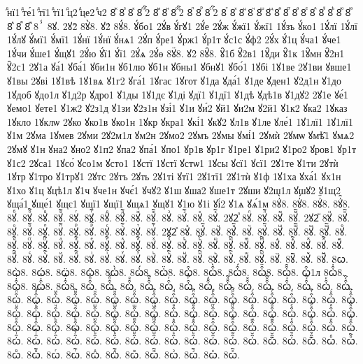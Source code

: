 {ⷣнї1
ⷣте́1
ⷣтї1
ⷣтї1
ⷣц2
ⷣце2
ⷣч2
8ⷤ
8ⷥ
8ⷦ
8ⷧ
ⷧ҇2
8ⷨ
8ⷩ
8ⷪ
ⷪ҇2
8ⷫ
8ⷬ
8ⷭ
ⷭ҇2
8ⷮ
8ⷯ
8ⷰ
8ⷱ
8ⷲ
8ⷳ
8ⷴ
8ⷵ
8ⷶ
8ⷷ
8ⷸ
8ⷹ
8ⷺ
8ⷻ
8ⷼ
8ⷽ
8ⷾ
8ⷿ
8ⸯ
8ꙋ.
2ꙋ2̀
8ꙋ̀8.
ꙋ2́
8ꙋ́8.
ꙋ́бо1
2ꙋ́в
ꙋ́гꙋ1
2ꙋ́е
2ꙋ́ж
ꙋ́жї1
ꙋ́жї1
1ꙋ́зъ
ꙋ́ко1
1ꙋ́лї
1ꙋ́лї
1ꙋ́лꙋ
ꙋ́мї1
ꙋ́мї1
1ꙋ́нї
1ꙋ́нї
ꙋ́нѧ1
2ꙋ́п
ꙋ́ре1
ꙋ́рж1
ꙋ́р1т
ꙋ́с1с
ꙋ́ф2
2ꙋ́х
ꙋ́1ц
ꙋ́ча1
ꙋ́че1
1ꙋ́чи
ꙋ́ше1
ꙋ́щꙋ1
2ꙋ́ю
ꙋ́ї1
ꙋ́ї1
2ꙋ́ѧ
2ꙋ́ѳ
8ꙋ̈8.
ꙋ2̑
8ꙋ̑8.
ꙋ̑1б
ꙋ̑2в1
1ꙋ̑ди
ꙋ̑1к
1ꙋ̑мн
ꙋ̑2н1
ꙋ̑2с1
2ꙋ1а
ꙋа́1
ꙋба́1
ꙋби1н
ꙋб1лю
ꙋб1н
ꙋбны1
ꙋбнꙋ1
ꙋбо́1
1ꙋбі
1ꙋ1ве
2ꙋ1ви
ꙋвше1
ꙋ1вы
2ꙋві
1ꙋ1вѣ
1ꙋ1вѧ
ꙋ1г2
ꙋга́1
1ꙋгас
1ꙋгот
ꙋ1да
ꙋда́1
ꙋ1де
ꙋден1
ꙋ2д1н
ꙋ1до
1ꙋдоб
ꙋдо1л
ꙋ1д2р
ꙋдро1
ꙋ1ды
1ꙋ1дє
ꙋ1ді
ꙋдї1
ꙋ1дї1
ꙋ1дѣ
ꙋдѣ1в
ꙋ1дꙋ2
2ꙋ1е
ꙋе́1
ꙋемо1
ꙋете1
ꙋ1ж2
ꙋ2з1д
ꙋ1зи
ꙋ2з1н
ꙋзі́1
ꙋ1и
ꙋи́2
ꙋй1
ꙋи2м
ꙋ2й1
ꙋ1к2
ꙋка2
1ꙋказ
1ꙋкло
1ꙋклѡ
2ꙋко
ꙋко1в
ꙋко1н
1ꙋкр
ꙋкра1
ꙋкі́1
ꙋкꙋ2
ꙋл1в
ꙋ1ле
ꙋле́1
1ꙋ1лї1
1ꙋ1лї1
ꙋ1м
2ꙋма
1ꙋмев
2ꙋми
2ꙋ2м1л
ꙋм2н
2ꙋмо2
2ꙋмъ
2ꙋмы
ꙋмі́1
2ꙋмѝ
2ꙋмѡ
ꙋмѣ̑1
ꙋмѧ2
2ꙋмꙋ
ꙋ1н
ꙋна2
ꙋно2
ꙋ1п2
ꙋпа2
ꙋпа́1
ꙋпо1
ꙋр1в
ꙋр1г
ꙋ1ре1
ꙋ1ри2
ꙋ1ро2
ꙋров1
ꙋр1т
ꙋ1с2
2ꙋса1
1ꙋсо́
ꙋсо1м
ꙋсто1
1ꙋстї
1ꙋстї
ꙋстѡ1
1ꙋсы
ꙋсї1
ꙋсї1
2ꙋ1те
ꙋ1ти
2ꙋтѝ
1ꙋтр
ꙋ1тро
ꙋ1трꙋ1
2ꙋтс
2ꙋтъ
2ꙋть
2ꙋ1ті
ꙋтї1
2ꙋ1тї1
2ꙋ1тѝ
ꙋ1ф
1ꙋ1ха
ꙋха́1
ꙋх1н
ꙋ1хо
ꙋ1ц
ꙋцѣ1л
ꙋ1ч
ꙋче1н
ꙋчє́1
ꙋчꙋ2
ꙋ1ш
ꙋша2
ꙋше1т
2ꙋши
ꙋ2ш1л
ꙋшꙋ2
ꙋ1щ2
ꙋща́1
ꙋще́1
ꙋщє1
ꙋщї1
ꙋщї1
ꙋщѧ1
ꙋщꙋ1
ꙋ1ю
ꙋ1і
ꙋі́2
ꙋ1ѧ
ꙋѧ́1м
8ꙋ҆̀8.
8ꙋ҆́8.
8ꙋ҆̈8.
8ꙋ҆̑8.
8ꙋⷠ.
8ꙋⷠ҇.
8ꙋⷡ.
8ꙋⷡ҇.
8ꙋⷢ.
8ꙋⷢ҇.
8ꙋⷣ.
8ꙋⷣ҇.
8ꙋⷤ.
8ꙋⷤ҇.
8ꙋⷥ.
8ꙋⷥ҇.
8ꙋⷦ.
8ꙋⷦ҇.
2ꙋ2ⷧ
8ꙋⷧ.
8ꙋⷧ҇.
8ꙋⷨ.
8ꙋⷨ҇.
2ꙋ2ⷩ
8ꙋⷩ.
8ꙋⷩ҇.
8ꙋⷪ.
8ꙋⷪ҇.
8ꙋⷫ.
8ꙋⷫ҇.
8ꙋⷬ.
8ꙋⷬ҇.
8ꙋⷭ.
8ꙋⷭ҇.
8ꙋⷮ.
8ꙋⷮ҇.
2ꙋ2ⷯ
8ꙋⷯ.
8ꙋⷯ҇.
8ꙋⷰ.
8ꙋⷰ҇.
8ꙋⷱ.
8ꙋⷱ҇.
8ꙋⷲ.
8ꙋⷲ҇.
8ꙋⷳ.
8ꙋⷳ҇.
8ꙋⷴ.
8ꙋⷴ҇.
8ꙋⷵ.
8ꙋⷵ҇.
8ꙋⷶ.
8ꙋⷶ҇.
8ꙋⷷ.
8ꙋⷷ҇.
8ꙋⷸ.
8ꙋⷸ҇.
8ꙋⷹ.
8ꙋⷹ҇.
8ꙋⷺ.
8ꙋⷺ҇.
8ꙋⷻ.
8ꙋⷻ҇.
8ꙋⷼ.
8ꙋⷼ҇.
8ꙋⷽ.
8ꙋⷽ҇.
8ꙋⷾ.
8ꙋⷾ҇.
8ꙋⷿ.
8ꙋⷿ҇.
8ꙋꙴ.
8ꙋꙴ҇.
8ꙋꙵ.
8ꙋꙵ҇.
8ꙋꙶ.
8ꙋꙶ҇.
8ꙋꙷ.
8ꙋꙷ҇.
8ꙋꙸ.
8ꙋꙸ҇.
8ꙋꙹ.
8ꙋꙹ҇.
8ꙋꙺ.
8ꙋꙺ҇.
8ꙋꙻ.
8ꙋꙻ҇.
8ꙋ꙼.
8ꙋ꙼҇.
8ꙋ꙽.
8ꙋ꙽҇.
8ꙍ.
8ꙍ̀8.
8ꙍ́8.
8ꙍ̈8.
8ꙍ̑8.
8ꙍ҆̀8.
8ꙍ҆́8.
8ꙍ҆̈8.
8ꙍ҆̑8.
8ꙍ҆̑̀8.
8ꙍ҆̑́8.
8ꙍ҆̑̈8.
8ꙍ҆̑̑8.
ꙍ҆̑1л
8ꙍ҆̑҆̀8.
8ꙍ҆̑҆́8.
8ꙍ҆̑҆̈8.
8ꙍ҆̑҆̑8.
8ꙍ҆̑ⷠ.
8ꙍ҆̑ⷠ҇.
8ꙍ҆̑ⷡ.
8ꙍ҆̑ⷡ҇.
8ꙍ҆̑ⷢ.
8ꙍ҆̑ⷢ҇.
8ꙍ҆̑ⷣ.
8ꙍ҆̑ⷣ҇.
8ꙍ҆̑ⷤ.
8ꙍ҆̑ⷤ҇.
8ꙍ҆̑ⷥ.
8ꙍ҆̑ⷥ҇.
8ꙍ҆̑ⷦ.
8ꙍ҆̑ⷦ҇.
8ꙍ҆̑ⷧ.
8ꙍ҆̑ⷧ҇.
8ꙍ҆̑ⷨ.
8ꙍ҆̑ⷨ҇.
8ꙍ҆̑ⷩ.
8ꙍ҆̑ⷩ҇.
8ꙍ҆̑ⷪ.
8ꙍ҆̑ⷪ҇.
8ꙍ҆̑ⷫ.
8ꙍ҆̑ⷫ҇.
8ꙍ҆̑ⷬ.
8ꙍ҆̑ⷬ҇.
8ꙍ҆̑ⷭ.
8ꙍ҆̑ⷭ҇.
8ꙍ҆̑ⷮ.
8ꙍ҆̑ⷮ҇.
8ꙍ҆̑ⷯ.
8ꙍ҆̑ⷯ҇.
8ꙍ҆̑ⷰ.
8ꙍ҆̑ⷰ҇.
8ꙍ҆̑ⷱ.
8ꙍ҆̑ⷱ҇.
8ꙍ҆̑ⷲ.
8ꙍ҆̑ⷲ҇.
8ꙍ҆̑ⷳ.
8ꙍ҆̑ⷳ҇.
8ꙍ҆̑ⷴ.
8ꙍ҆̑ⷴ҇.
8ꙍ҆̑ⷵ.
8ꙍ҆̑ⷵ҇.
8ꙍ҆̑ⷶ.
8ꙍ҆̑ⷶ҇.
8ꙍ҆̑ⷷ.
8ꙍ҆̑ⷷ҇.
8ꙍ҆̑ⷸ.
8ꙍ҆̑ⷸ҇.
8ꙍ҆̑ⷹ.
8ꙍ҆̑ⷹ҇.
8ꙍ҆̑ⷺ.
8ꙍ҆̑ⷺ҇.
8ꙍ҆̑ⷻ.
8ꙍ҆̑ⷻ҇.
8ꙍ҆̑ⷼ.
8ꙍ҆̑ⷼ҇.
8ꙍ҆̑ⷽ.
8ꙍ҆̑ⷽ҇.
8ꙍ҆̑ⷾ.
8ꙍ҆̑ⷾ҇.
8ꙍ҆̑ⷿ.
8ꙍ҆̑ⷿ҇.
8ꙍ҆̑ꙴ.
8ꙍ҆̑ꙴ҇.
8ꙍ҆̑ꙵ.
8ꙍ҆̑ꙵ҇.
8ꙍ҆̑ꙶ.
8ꙍ҆̑ꙶ҇.
8ꙍ҆̑ꙷ.
8ꙍ҆̑ꙷ҇.
8ꙍ҆̑ꙸ.
8ꙍ҆̑ꙸ҇.
8ꙍ҆̑ꙹ.
8ꙍ҆̑ꙹ҇.
8ꙍ҆̑ꙺ.
8ꙍ҆̑ꙺ҇.
8ꙍ҆̑ꙻ.
8ꙍ҆̑ꙻ҇.
8ꙍ҆̑꙼.
8ꙍ҆̑꙼҇.
8ꙍ҆̑꙽.
8ꙍ҆̑꙽҇.
8ꙍⷠ.
8ꙍⷠ҇.
8ꙍⷡ.
8ꙍⷡ҇.
8ꙍⷢ.
8ꙍⷢ҇.
8ꙍⷣ.
8ꙍⷣ҇.
8ꙍⷤ.
8ꙍⷤ҇.
8ꙍⷥ.
8ꙍⷥ҇.
8ꙍⷦ.
8ꙍⷦ҇.
}
